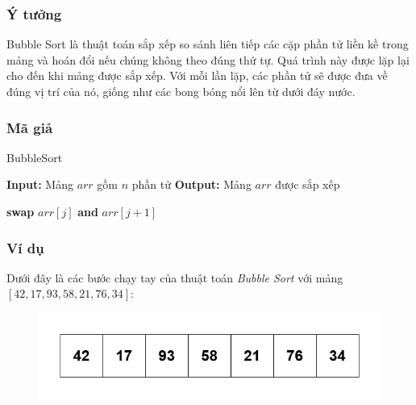 \subsubsection{Ý tưởng}
Bubble Sort là thuật toán sắp xếp so sánh liên tiếp các cặp phần tử liền kề trong mảng và hoán đổi nếu chúng không theo đúng thứ tự. Quá trình này được lặp lại cho đến khi mảng được sắp xếp. Với mỗi lần lặp, các phần tử sẽ được đưa về đúng vị trí của nó, giống như các bong bóng nổi lên từ dưới đáy nước. \cite{appiah2015magnetic}
\subsubsection{Mã giả}

\begin{algorithm}[H]
\caption{BubbleSort}
\begin{algorithmic}[1]
    \State \textbf{Input:} Mảng $arr$ gồm $n$ phần tử
    \State \textbf{Output:} Mảng $arr$ được sắp xếp
    
                \State \textbf{swap} $arr[j]$ \textbf{and} $arr[j+1]$
            \EndIf
        \EndFor
    \EndFor
\EndProcedure
\end{algorithmic}
\end{algorithm}

\subsubsection{Ví dụ}

Dưới đây là các bước chạy tay của thuật toán \textit{Bubble Sort} với mảng $[42, 17, 93, 58, 21, 76, 34]$:
\begin{figure}[H]
    \centering
    \includegraphics[width=0.75\linewidth]{img/bubble_sort/1.png}
\end{figure}

